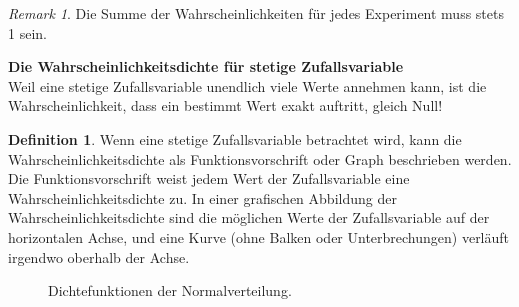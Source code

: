 \documentclass{article}
\theoremstyle{definition}
\newtheorem{definition}{Definition}[subsection]
\theoremstyle{remark}
\newtheorem*{remark}{Remark}
\begin{document}
\begin{remark}
    Die Summe der Wahrscheinlichkeiten für jedes Experiment muss stets 1 sein.
\end{remark}
\noindent \textbf{Die Wahrscheinlichkeitsdichte für stetige Zufallsvariable} \\ Weil eine stetige Zufallsvariable unendlich viele Werte annehmen kann, ist die Wahrscheinlichkeit, dass ein bestimmt Wert exakt auftritt, gleich Null!

\begin{definition}
    Wenn eine stetige Zufallsvariable betrachtet wird, kann die Wahrscheinlichkeitsdichte als Funktionsvorschrift oder Graph beschrieben werden. Die Funktionsvorschrift weist jedem Wert der Zufallsvariable eine Wahrscheinlichkeitsdichte zu. In einer grafischen Abbildung der Wahrscheinlichkeitsdichte sind die möglichen Werte der Zufallsvariable auf der horizontalen Achse, und eine Kurve (ohne Balken oder Unterbrechungen) verläuft irgendwo oberhalb der Achse.
\end{definition}

\begin{figure}[h]
    \centering
    
    \caption{Dichtefunktionen der Normalverteilung.}
    \label{fig:Dichtefunktion}
\end{figure}
\end{document}

